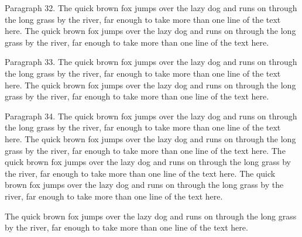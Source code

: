 \documentclass{article}
\begin{document}
Paragraph 32. The quick brown fox jumps over the lazy dog and runs on through the long grass by the river, far enough to take more than one line of the text here. The quick brown fox jumps over the lazy dog and runs on through the long grass by the river, far enough to take more than one line of the text here.

Paragraph 33. The quick brown fox jumps over the lazy dog and runs on through the long grass by the river, far enough to take more than one line of the text here. The quick brown fox jumps over the lazy dog and runs on through the long grass by the river, far enough to take more than one line of the text here.

Paragraph 34. The quick brown fox jumps over the lazy dog and runs on through the long grass by the river, far enough to take more than one line of the text here. The quick brown fox jumps over the lazy dog and runs on through the long grass by the river, far enough to take more than one line of the text here.
\bigskip
The quick brown fox jumps over the lazy dog and runs on through the long grass by the river, far enough to take more than one line of the text here.
\newpage
The quick brown fox jumps over the lazy dog and runs on through the long grass by the river, far enough to take more than one line of the text here.

\vfill
\Large The quick brown fox jumps over the lazy dog and runs on through the long grass by the river, far enough to take more than one line of the text here.
\end{document}
